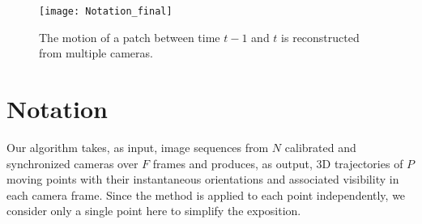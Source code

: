 \documentclass[10pt,twocolumn,letterpaper]{article}
\begin{document}
\begin{figure}[t]
\begin{center}
\texttt{[image: Notation\_final]}
\caption{The motion of a patch between time $t-1$ and $t$ is reconstructed from multiple cameras.}
\label{fig:notation}
\end{center}
\end{figure}
\section{Notation}
Our algorithm takes, as input, image sequences from $N$ calibrated and synchronized cameras over $F$ frames and produces, as output, 3D trajectories of $P$ moving points with their instantaneous orientations and associated visibility in each camera frame. Since the method is applied to each point independently, we consider only a single point here to simplify the exposition.
 
\end{document}
